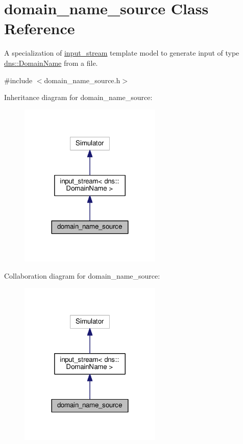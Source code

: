 \hypertarget{classdomain__name__source}{}\section{domain\+\_\+name\+\_\+source Class Reference}
\label{classdomain__name__source}


A specialization of \hyperlink{classinput__stream}{input\+\_\+stream} template model to generate input of type \hyperlink{structdns_1_1DomainName}{dns\+::\+Domain\+Name} from a file.  




{\ttfamily \#include $<$domain\+\_\+name\+\_\+source.\+h$>$}



Inheritance diagram for domain\+\_\+name\+\_\+source\+:\nopagebreak
\begin{figure}[H]
\begin{center}
\leavevmode
\includegraphics[width=192pt]{classdomain__name__source__inherit__graph}
\end{center}
\end{figure}


Collaboration diagram for domain\+\_\+name\+\_\+source\+:\nopagebreak
\begin{figure}[H]
\begin{center}
\leavevmode
\includegraphics[width=192pt]{classdomain__name__source__coll__graph}
\end{center}
\end{figure}
